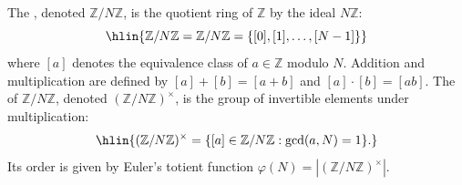 \begin{definition} \label{definition:Z_over_NZ}
The , denoted $\mathbb{Z}/N\mathbb{Z}$, is the quotient ring of $\mathbb{Z}$ by the ideal $N\mathbb{Z}$:
$$\hlin{\mathbb{Z}/N\mathbb{Z} = \mathbb{Z} / N\mathbb{Z} = \{ [0], [1], \ldots, [N-1] \}}$$
where $[a]$ denotes the equivalence class of $a \in \mathbb{Z}$ modulo $N$.
Addition and multiplication are defined by $[a] + [b] = [a+b]$ and $[a] \cdot [b] = [ab]$.
The  of $\mathbb{Z}/N\mathbb{Z}$, denoted $(\mathbb{Z}/N\mathbb{Z})^\times$, is the group of invertible elements under multiplication:
$$\hlin{(\mathbb{Z}/N\mathbb{Z})^\times = \{ [a] \in \mathbb{Z}/N\mathbb{Z} : \gcd(a, N) = 1 \}.}$$
Its order is given by Euler's totient function $\varphi(N) = |( \mathbb{Z}/N\mathbb{Z})^\times|$.
\end{definition}
